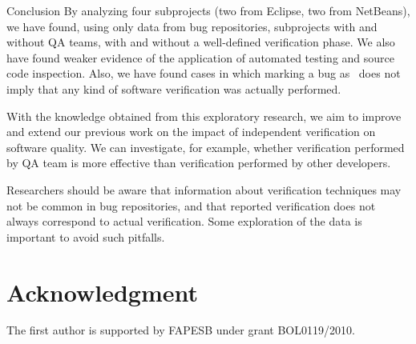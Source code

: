 \begin{section}{Conclusion} \label{sec:conclusion}
	By analyzing four subprojects (two from Eclipse, two from NetBeans), we have found, using only data from bug repositories, subprojects with and without QA teams, with and without a well-defined verification phase. We also have found weaker evidence of the application of automated testing and source code inspection. Also, we have found cases in which marking a bug as \VERIFIED\ does not imply that any kind of software verification was actually performed.
			
	With the knowledge obtained from this exploratory research, we aim to improve and extend our previous work on the impact of independent verification on software quality. We can investigate, for example, whether verification performed by QA team is more effective than verification performed by other developers.
	
	Researchers should be aware that information about verification techniques may not be common in bug repositories, and that reported verification does not always correspond to actual verification. Some exploration of the data is important to avoid such pitfalls.
	
	
\end{section}

\section*{Acknowledgment}

The first author is supported by FAPESB under grant BOL0119/2010.
